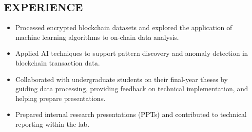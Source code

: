 \begin{samepage}
\section{EXPERIENCE}
{
{\begin{itemize}
  \item Processed encrypted blockchain datasets and explored the application of machine learning algorithms to on-chain data analysis.
  \item Applied AI techniques to support pattern discovery and anomaly detection in blockchain transaction data.
  \item Collaborated with undergraduate students on their final-year theses by guiding data processing, providing feedback on technical implementation, and helping prepare presentations.
  \item Prepared internal research presentations (PPTs) and contributed to technical reporting within the lab.
\end{itemize}
}}
\end{samepage}
